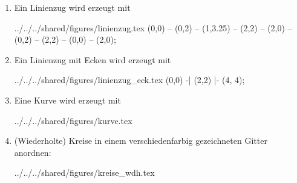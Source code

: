 \begin{enumerate}
  \item Ein Linienzug wird erzeugt mit
\begin{verbatimwrite}{../../../shared/figures/linienzug.tex}
\tikz \draw[thick,rounded corners=2pt] %
(0,0) -- (0,2) -- (1,3.25) -- (2,2) -- %
(2,0) -- (0,2) -- (2,2) -- (0,0) -- (2,0);  %
\end{verbatimwrite}
    

    
  \item Ein Linienzug mit Ecken wird erzeugt mit
\begin{verbatimwrite}{../../../shared/figures/linienzug_eck.tex}
  \tikz \draw[thick]                   %
  (0,0) -| (2,2) |- (4, 4);            %
\end{verbatimwrite}
    

    
  \item Eine Kurve wird erzeugt mit
\begin{verbatimwrite}{../../../shared/figures/kurve.tex}
\end{verbatimwrite}
    

    
  \item (Wiederholte) Kreise in einem verschiedenfarbig gezeichneten Gitter anordnen:
\begin{verbatimwrite}{../../../shared/figures/kreise_wdh.tex}
\end{verbatimwrite}
    


\end{enumerate}
